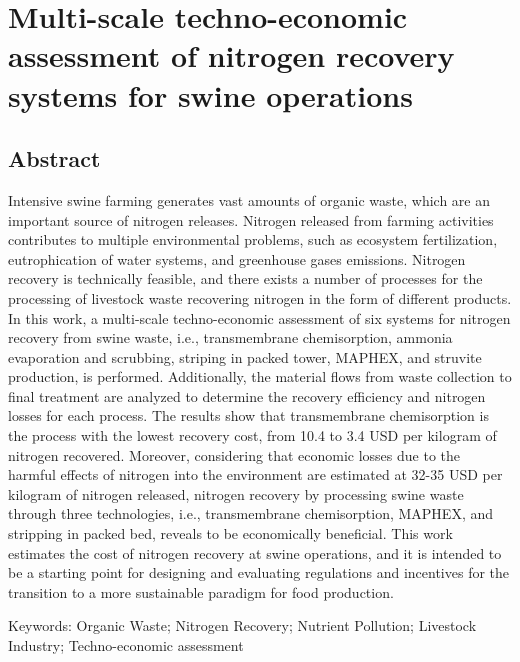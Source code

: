 \chapter{Multi-scale techno-economic assessment of nitrogen recovery systems for swine operations }\label{ch:NitrogenTechs}
\begin{refsection}[referencesCh6]
\section*{Abstract}
Intensive swine farming generates vast amounts of organic waste, which are an important source of nitrogen releases. Nitrogen released from farming activities contributes to multiple environmental problems, such as ecosystem fertilization, eutrophication of water systems, and greenhouse gases emissions. Nitrogen recovery is technically feasible, and there exists a number of processes for the processing of livestock waste recovering nitrogen in the form of different products.
In this work, a multi-scale techno-economic assessment of six systems for nitrogen recovery from swine waste, i.e., transmembrane  chemisorption, ammonia evaporation and scrubbing, striping in packed tower, MAPHEX, and struvite production, is performed. Additionally, the material flows from waste collection to final treatment are analyzed to determine the recovery efficiency and nitrogen losses for each  process. The results show that transmembrane chemisorption is the process with the lowest recovery cost, from 10.4 to 3.4 USD per kilogram of nitrogen recovered. Moreover, considering that economic losses due to the harmful effects of nitrogen into the environment are estimated at 32-35 USD per kilogram of nitrogen released, nitrogen recovery by processing swine waste through three technologies, i.e., transmembrane chemisorption, MAPHEX, and stripping in packed bed, reveals to be economically beneficial. This work estimates the cost of nitrogen recovery at swine operations, and it is intended to be a starting point for designing and evaluating regulations and incentives for the transition to a more sustainable paradigm for food production.

\bigskip
Keywords: Organic Waste; Nitrogen Recovery; Nutrient Pollution; Livestock Industry; Techno-economic assessment
\newpage


\end{refsection}
